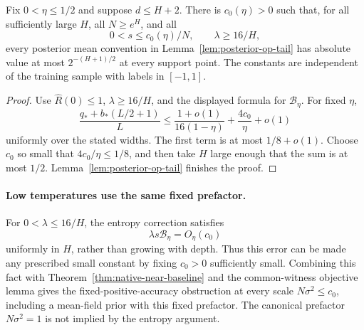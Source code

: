 \begin{corollary}
\label{cor:small-prefactor-high-temperature}
Fix $0<\eta\le1/2$ and suppose $d\le H+2$. There is $c_0(\eta)>0$ such that, for all sufficiently large $H$, all $N\ge e^H$, and all
\[
 0<s\le c_0(\eta)/N,\qquad \lambda\ge16/H,
\]
every posterior mean convention in Lemma~\ref{lem:posterior-op-tail} has absolute value at most $2^{-(H+1)/2}$ at every support point. The constants are independent of the training sample with labels in $[-1,1]$.
\end{corollary}
\begin{proof}
Use $\widehat R(0)\le1$, $\lambda\ge16/H$, and the displayed formula for $\mathcal B_\eta$. For fixed $\eta$,
\[
 \frac{q_*+b_*(L/2+1)}L
 \le\frac{1+o(1)}{16(1-\eta)}+\frac{4c_0}{\eta}+o(1)
\]
uniformly over the stated widths. The first term is at most $1/8+o(1)$. Choose $c_0$ so small that $4c_0/\eta\le1/8$, and then take $H$ large enough that the sum is at most $1/2$. Lemma~\ref{lem:posterior-op-tail} finishes the proof.
\end{proof}

\paragraph{Low temperatures use the same fixed prefactor.}
For $0<\lambda\le16/H$, the entropy correction satisfies
\[
 \lambda s\mathcal B_\eta=O_\eta(c_0)
\]
uniformly in $H$, rather than growing with depth. Thus this error can be made any prescribed small constant by fixing $c_0>0$ sufficiently small. Combining this fact with Theorem~\ref{thm:native-near-baseline} and the common-witness objective lemma gives the fixed-positive-accuracy obstruction at every scale $N\sigma^2\le c_0$, including a mean-field prior with this fixed prefactor. The canonical prefactor $N\sigma^2=1$ is not implied by the entropy argument.

